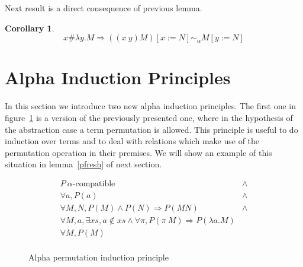 \documentclass[preprint,10pt]{sigplanconf}
\newcommand{\lam}{\ensuremath{\lambda}}
\newcommand{\alpsym}{\ensuremath{\sim_\alpha}}
\newtheorem{lemma}{Lemma}
\newtheorem{coro}{Corollary}
\begin{document}
Next result is a direct consequence of previous lemma.

\begin{coro}
\label{pequivcoro}
\[ x \# \lam y . M  \Rightarrow ((x\ y) M) [x{:=}N] \alpsym  M [y {:=} N] \]  
\end{coro}



\section{Alpha Induction Principles}

In this section we introduce two new alpha induction principles. The first one in figure~\ref{fig:alphapermind} is a  version of the previously presented one, where in the hypothesis of the abstraction case a term permutation is allowed. 
This principle is useful to do induction over terms and to deal with relations which make use of the permutation operation in their premises. 
We will show an example of this situation in  lemma~\ref{pfresh} of next section.

\begin{figure}[h]
\[ 
  \begin{array}{lc}
    P\ \alpha\text{-compatible} & \wedge \\
    \forall a, P(a) & \wedge\\
    \forall M, N,  P(M) \wedge P(N)  \Rightarrow P (M N) & \wedge \\    
     \forall M, a,  \exists xs, a \not \in xs \wedge \forall \pi, P(\pi\ M)  \Rightarrow P (\lam a . M)  &\\    
    \hline
    \forall M, P(M)\\
  \end{array}
\]
  \caption{Alpha permutation induction principle}
  \label{fig:alphapermind}
\end{figure}
\end{document}
